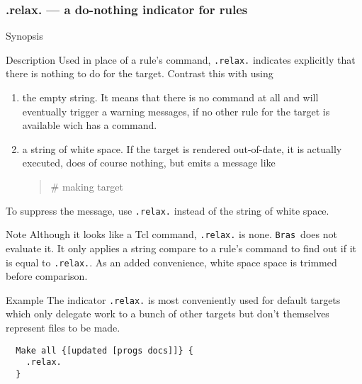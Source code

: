 \documentclass[11pt]{scrartcl}
\makeatletter
\newcommand{\Bras}{\texttt{Bras}}
\newcommand{\Indextt}[1]{\texttt{#1}\index{#1@\texttt{#1}}}
\makeatother
\begin{document}
\subsubsection{.relax. --- a do-nothing indicator for rules}
\label{proc:.relax.}
\begin{Describe}
\item[Synopsis] 
\item[Description] Used in place of a rule's command, \texttt{.relax.}
  indicates explicitly that there is nothing to do for the target.
  Contrast this with using
  \begin{enumerate}
  \item the empty string. It means that there is no command at all and
    will eventually trigger a warning messages, if no other rule for
    the target is available wich has a command.
  \item a string of white space. If the target is rendered
    out-of-date, it is actually executed, does of course nothing, but
    emits a message like
    \begin{quote}
      \ttfamily \# making target
    \end{quote}
  \end{enumerate}
  To suppress the message, use \Indextt{.relax.} instead of the
  string of white space.
\item[Note] Although it looks like a Tcl command, \texttt{.relax.} is
  none. \Bras\ does not evaluate it. It only applies a string compare
  to a rule's command to find out if it is equal to \texttt{.relax.}.
  As an added convenience, white space space is trimmed before
  comparison.
\item[Example] The indicator \texttt{.relax.} is most conveniently
  used for default targets which only delegate work to a bunch of other
  targets but don't themselves represent files to be made.
  \begin{verbatim}
  Make all {[updated [progs docs]]} {
    .relax.
  }
  \end{verbatim}
\end{Describe}
\end{document}
